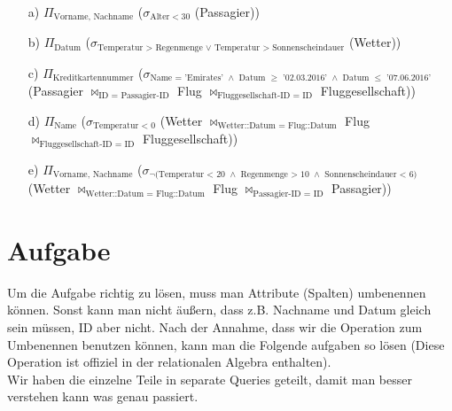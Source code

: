 \begin{itemize}


\item[a)]
$\Pi_{\text{Vorname, Nachname}}$ ($\sigma_{\text{Alter} < 30 }$ (Passagier))

\item[b)]
$\Pi_{\text{Datum}}$ ($\sigma_{\text{Temperatur > Regenmenge } \lor \text{ Temperatur > Sonnenscheindauer} }$ (Wetter))

\item[c)]
$\Pi_{\text{Kreditkartennummer}}$ ($\sigma_{\text{Name = 'Emirates' $\land$ Datum $\geq$ '02.03.2016' $\land$ Datum $\leq$ '07.06.2016'}}$  (Passagier $\bowtie_{\text{ID = Passagier-ID}}$ Flug $\bowtie_{\text{Fluggesellschaft-ID = ID}}$ Fluggesellschaft))

\item[d)]
$\Pi_{\text{Name}}$ ($\sigma_{\text{Temperatur < 0}}$ (Wetter $\bowtie_{\text{Wetter::Datum = Flug::Datum}}$ Flug $\bowtie_{\text{Fluggesellschaft-ID = ID}}$ Fluggesellschaft))

\item[e)]
$\Pi_{\text{Vorname, Nachname}}$ ($\sigma_{\neg\text{(Temperatur < 20 $\land$ Regenmenge > 10 $\land$ Sonnenscheindauer < 6)}}$ (Wetter $\bowtie_{\text{Wetter::Datum = Flug::Datum}}$ Flug $\bowtie_{\text{Passagier-ID = ID}}$ Passagier))

\end{itemize}

\section{Aufgabe}

Um die Aufgabe richtig zu lösen, muss man Attribute (Spalten) umbenennen können. Sonst kann man nicht äußern, dass z.B. Nachname und Datum gleich sein müssen, ID aber nicht. 
Nach der Annahme, dass wir die Operation zum Umbenennen benutzen können, kann man die Folgende aufgaben so lösen (Diese Operation ist offiziel in der relationalen Algebra enthalten). \\

Wir haben die einzelne Teile in separate Queries geteilt, damit man besser verstehen kann was genau passiert.

